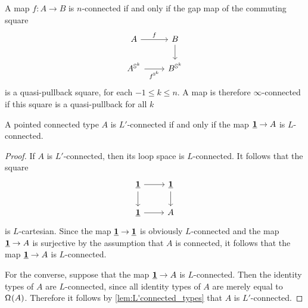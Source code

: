 \begin{cor}
A map $f:A\to B$ is $n$-connected if and only if the gap map of the commuting square
\begin{equation*}
\begin{tikzcd}
A \arrow[r,"f"] & B \arrow[d] \\
A^{\sphere{k}} \arrow[r,swap,"f^{\sphere{k}}"] & B^{\sphere{k}}
\end{tikzcd}
\end{equation*}
is a quasi-pullback square, for each $-1\leq k\leq n$. A map is therefore $\infty$-connected if this square is a quasi-pullback for all $k$
\end{cor}

\begin{cor}\label{cor:ptd_connected}
A pointed connected type $A$ is $L'$-connected if and only if the map $\underline{\mathbf{1}}\to A$ is $L$-connected.
\end{cor}

\begin{proof}
If $A$ is $L'$-connected, then its loop space is $L$-connected. It follows that the square
\begin{equation*}
\begin{tikzcd}
\unit \arrow[r] \arrow[d] & \unit \arrow[d] \\
\unit \arrow[r] & A
\end{tikzcd}
\end{equation*}
is $L$-cartesian. Since the map $\underline{\mathbf{1}}\to\underline{\mathbf{1}}$ is obviously $L$-connected and the map $\underline{\mathbf{1}}\to A$ is surjective by the assumption that $A$ is connected, it follows that the map $\underline{\mathbf{1}}\to A$ is $L$-connected.

For the converse, suppose that the map $\underline{\mathbf{1}}\to A$ is $L$-connected. Then the identity types of $A$ are $L$-connected, since all identity types of $A$ are merely equal to $\mathsf{\Omega}^{}(A)$. Therefore it follows by \cref{lem:L'connected_types} that $A$ is $L'$-connected.
\end{proof}

